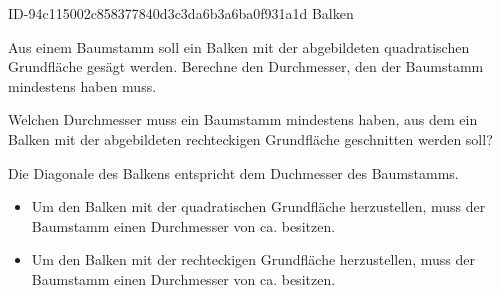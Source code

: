 \begin{exercise}
      {ID-94c115002c858377840d3c3da6b3a6ba0f931a1d}
      {Balken}
  \ifproblem\problem\par
    \begin{minipage}[c]{0.20\linewidth}
      \centering
    \end{minipage}\hfill
    \begin{minipage}[c]{0.79\linewidth}
    Aus einem Baumstamm soll ein Balken mit der abgebildeten quadratischen
    Grundfläche gesägt werden. Berechne den Durchmesser, den der Baumstamm
    mindestens haben muss.
    \end{minipage}\par
    \begin{minipage}[c]{0.20\linewidth}
      \centering
    \end{minipage}\hfill
    \begin{minipage}[c]{0.79\linewidth}
    Welchen Durchmesser muss ein Baumstamm mindestens haben, aus dem
    ein Balken mit der abgebildeten rechteckigen Grundfläche geschnitten
    werden soll?
    \end{minipage}
  \fi
  \ifoutline\outline\par
    Die Diagonale des Balkens entspricht dem Duchmesser des Baumstamms.
  \fi
  \ifoutcome\outcome\par
    \begin{itemize}
      \item Um den Balken mit der quadratischen Grundfläche herzustellen,
            muss der Baumstamm einen Durchmesser von ca.  besitzen.
      \item Um den Balken mit der rechteckigen Grundfläche herzustellen,
            muss der Baumstamm einen Durchmesser von ca.  besitzen.
    \end{itemize}
  \fi
\end{exercise}
